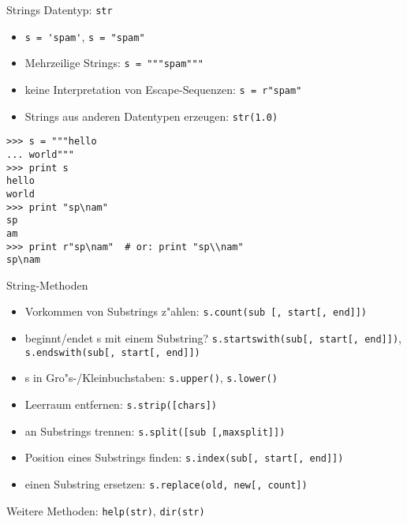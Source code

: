 \begin{frame}[fragile]{Strings}
Datentyp: \alert{\lstinline{str}}
\begin{itemize}
\item \lstinline{s = 'spam'}, \lstinline{s = "spam"}
\item Mehrzeilige Strings: \lstinline{s = """spam"""}
\item keine Interpretation von Escape-Sequenzen: \lstinline{s = r"spam"}
\item Strings aus anderen Datentypen erzeugen: \lstinline{str(1.0)}
\end{itemize}
\begin{lstlisting}[style=Shell]
>>> s = """hello
... world"""
>>> print s
hello
world
>>> print "sp\nam"
sp
am
>>> print r"sp\nam"  # or: print "sp\\nam"
sp\nam
\end{lstlisting}
\end{frame}

\begin{frame}{String-Methoden}
\begin{itemize}
\item Vorkommen von Substrings z"ahlen: \lstinline{s.count(sub [, start[, end]])}
\item beginnt/endet s mit einem Substring? \lstinline{s.startswith(sub[, start[, end]])}, \lstinline{s.endswith(sub[, start[, end]])}
\item s in Gro"s-/Kleinbuchstaben: \lstinline{s.upper()}, \lstinline{s.lower()}
\item Leerraum entfernen: \lstinline{s.strip([chars])}
\item an Substrings trennen: \lstinline{s.split([sub [,maxsplit]])}
\item Position eines Substrings finden: \lstinline{s.index(sub[, start[, end]])}
\item einen Substring ersetzen: \lstinline{s.replace(old, new[, count])}
\end{itemize}
Weitere Methoden: \lstinline{help(str)}, \lstinline{dir(str)}
\end{frame}

